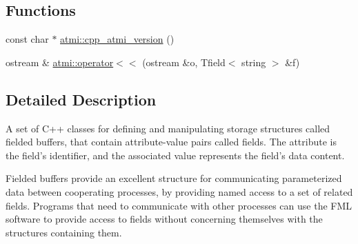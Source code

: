 \subsection*{Functions}
\begin{DoxyCompactItemize}
\item 
const char $\ast$ \hyperlink{group__fml_ga1db5d7cd1f711e43cd63dedbd9e3f8d1}{atmi\+::cpp\+\_\+atmi\+\_\+version} ()
\item 
ostream \& \hyperlink{group__fml_gaaf1bf620dc4ebad71a8f2b98e45107e3}{atmi\+::operator$<$$<$} (ostream \&o, Tfield$<$ string $>$ \&f)
\end{DoxyCompactItemize}


\subsection{Detailed Description}
A set of C++ classes for defining and manipulating storage structures called fielded buffers, that contain attribute-\/value pairs called fields. The attribute is the field’s identifier, and the associated value represents the field’s data content.

Fielded buffers provide an excellent structure for communicating parameterized data between cooperating processes, by providing named access to a set of related fields. Programs that need to communicate with other processes can use the F\+M\+L software to provide access to fields without concerning themselves with the structures containing them. 

